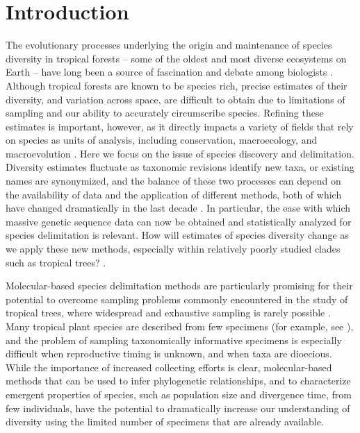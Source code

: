 \documentclass[10pt,letterpaper]{article}
\begin{document}
\linenumbers

\section*{Introduction}
The evolutionary processes underlying the origin and maintenance of species diversity in tropical forests – some of the oldest and most diverse ecosystems on Earth – have long been a source of fascination and debate among biologists \cite{stebbins_flowering_1974,wiens_historical_2004}. Although tropical forests are known to be species rich, precise estimates of their diversity, and variation across space, are difficult to obtain due to limitations of sampling and our ability to accurately circumscribe species. Refining these estimates is important, however, as it directly impacts a variety of fields that rely on species as units of analysis, including conservation, macroecology, and macroevolution \cite{myers_biodiversity_2000,federman_implications_2016}. Here we focus on the issue of species discovery and delimitation. Diversity estimates fluctuate as taxonomic revisions identify new taxa, or existing names are synonymized, and the balance of these two processes can depend on the availability of data and the application of different methods, both of which have changed dramatically in the last decade \cite{baird_rapid_2008,leache_species_2014}. In particular, the ease with which massive genetic sequence data can now be obtained and statistically analyzed for species delimitation is relevant. How will estimates of species diversity change as we apply these new methods, especially within relatively poorly studied clades such as tropical trees? \cite{vences_madagascar_2009,bebber_herbaria_2010,joppa_how_2010,ter_steege_discovery_2016}.



Molecular-based species delimitation methods are particularly promising for their potential to overcome sampling problems commonly encountered in the study of tropical trees, where widespread and exhaustive sampling is rarely possible \cite{ter_steege_discovery_2016}. Many tropical plant species are described from few specimens (for example, see \cite{daly_revision_2015}), and the problem of sampling taxonomically informative specimens is especially difficult when reproductive timing is unknown, and when taxa are dioecious. While the importance of increased collecting efforts is clear, molecular-based methods that can be used to infer phylogenetic relationships, and to characterize emergent properties of species, such as population size and divergence time, from few individuals, have the potential to dramatically increase our understanding of diversity using the limited number of specimens that are already available.
\end{document}
